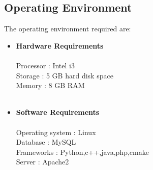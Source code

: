 \subsection{Operating Environment}
The operating environment required are: \\
\begin{itemize}
\\
\item\textbf{ Hardware Requirements} \\ \\
Processor			:	Intel i3\\
Storage				: 	5 GB hard disk space\\
Memory				: 	8 GB RAM\\ 
\\
\item\textbf{Software Requirements} \\ \\
Operating system	: 	Linux\\
Database			: 	MySQL\\
Frameworks			: 	Python,c++,java,php,cmake\\
Server				: 	Apache2\\ \\ \\
\end{itemize}
